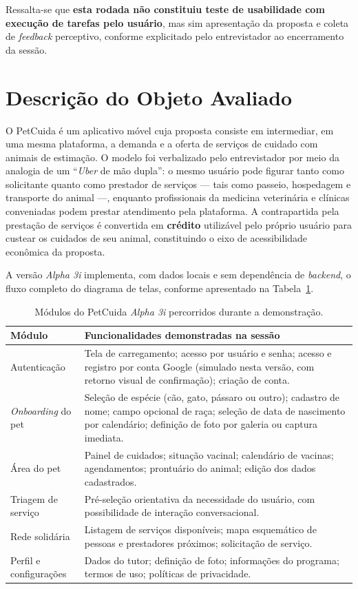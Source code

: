 \documentclass[12pt,a4paper]{article}
\begin{document}
Ressalta-se que \textbf{esta rodada não constituiu teste de usabilidade com execução de
tarefas pelo usuário}, mas sim apresentação da proposta e coleta de \textit{feedback}
perceptivo, conforme explicitado pelo entrevistador ao encerramento da sessão.

\section{Descrição do Objeto Avaliado}

O PetCuida é um aplicativo móvel cuja proposta consiste em intermediar, em uma mesma
plataforma, a demanda e a oferta de serviços de cuidado com animais de estimação. O modelo
foi verbalizado pelo entrevistador por meio da analogia de um \enquote{\textit{Uber} de mão
dupla}: o mesmo usuário pode figurar tanto como solicitante quanto como prestador de
serviços --- tais como passeio, hospedagem e transporte do animal ---, enquanto profissionais
da medicina veterinária e clínicas conveniadas podem prestar atendimento pela plataforma.
A contrapartida pela prestação de serviços é convertida em \textbf{crédito} utilizável pelo
próprio usuário para custear os cuidados de seu animal, constituindo o eixo de acessibilidade
econômica da proposta.

A versão \textit{Alpha 3i} implementa, com dados locais e sem dependência de
\textit{backend}, o fluxo completo do diagrama de telas, conforme apresentado na
Tabela~\ref{tab:modulos}.

\begin{table}[h!]
\centering
\small
\begin{tabular}{@{}>{\raggedright\arraybackslash}p{4.2cm}>{\raggedright\arraybackslash}p{9.5cm}@{}}
\toprule
\textbf{Módulo} & \textbf{Funcionalidades demonstradas na sessão} \\
\midrule
Autenticação & Tela de carregamento; acesso por usuário e senha; acesso e registro por conta Google (simulado nesta versão, com retorno visual de confirmação); criação de conta. \\
\textit{Onboarding} do pet & Seleção de espécie (cão, gato, pássaro ou outro); cadastro de nome; campo opcional de raça; seleção de data de nascimento por calendário; definição de foto por galeria ou captura imediata. \\
Área do pet & Painel de cuidados; situação vacinal; calendário de vacinas; agendamentos; prontuário do animal; edição dos dados cadastrados. \\
Triagem de serviço & Pré-seleção orientativa da necessidade do usuário, com possibilidade de interação conversacional. \\
Rede solidária & Listagem de serviços disponíveis; mapa esquemático de pessoas e prestadores próximos; solicitação de serviço. \\
Perfil e configurações & Dados do tutor; definição de foto; informações do programa; termos de uso; políticas de privacidade. \\
\bottomrule
\end{tabular}
\caption{Módulos do PetCuida \textit{Alpha 3i} percorridos durante a demonstração.}
\label{tab:modulos}
\end{table}
\end{document}
